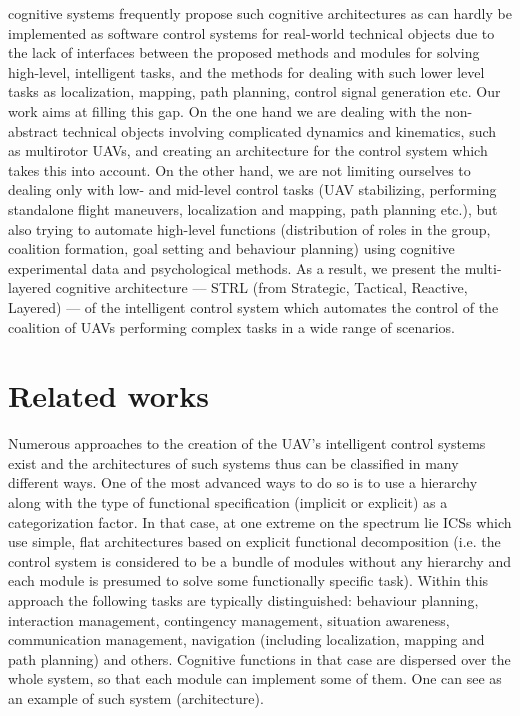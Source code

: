 \documentclass[review]{elsarticle}
\begin{document}
cognitive systems frequently propose such cognitive architectures as can hardly be implemented as software control systems for real-world technical objects due to the lack of interfaces between the proposed methods and modules for solving high-level, intelligent tasks, and the methods for dealing with such lower level tasks as localization, mapping, path planning, control signal generation etc. Our work aims at filling this gap. On the one hand we are dealing with the non-abstract technical objects involving complicated dynamics and kinematics, such as multirotor UAVs, and creating an architecture for the control system which takes this into account. On the other hand, we are not limiting ourselves to dealing only with low- and mid-level control tasks (UAV stabilizing, performing standalone flight maneuvers, localization and mapping, path planning etc.), but also trying to automate  high-level functions (distribution of roles in the group, coalition formation, goal setting and behaviour planning) using cognitive experimental data and psychological methods. As a result, we present the multi-layered cognitive architecture --- STRL (from Strategic, Tactical, Reactive, Layered) --- of the intelligent control system which automates the control of the coalition of UAVs performing complex tasks in a wide range of scenarios.

\section{Related works}\label{sec:related}

Numerous approaches to the creation of the UAV's intelligent control systems exist and the architectures of such systems thus can be classified in many different ways. One of the most advanced ways to do so is to use a hierarchy along with the type of functional specification (implicit or explicit) as a categorization factor. In that case, at one extreme on the spectrum lie ICSs which use simple, flat architectures based on explicit functional decomposition (i.e. the control system is considered to be a bundle of modules without any hierarchy and each module is presumed to solve some functionally specific task). Within this approach the following tasks are typically distinguished: behaviour planning, interaction management, contingency management, situation awareness, communication management, navigation (including localization, mapping and path planning) and others. Cognitive functions in that case are dispersed over the whole system, so that each module can implement some of them. One can see \cite{Jameson2005} as an example of such system (architecture). 
\end{document}
